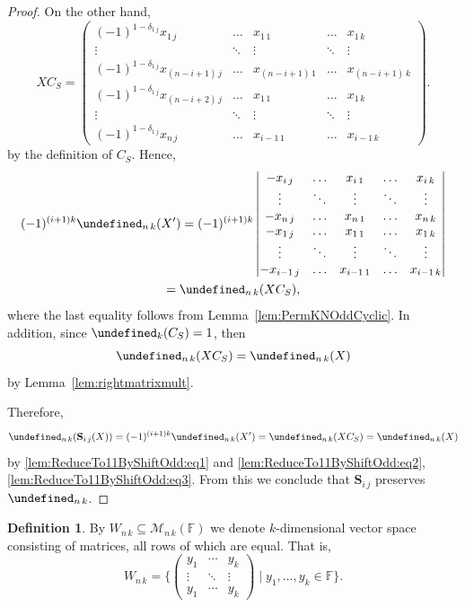 \documentclass{elsarticle}
\def\F{{\mathbb F}}
\def\M{{\mathcal M}}
\def\SCS{{\mathbf S}}
\let\det\undefined
\DeclareMathOperator{\det}{det}
\theoremstyle{plain}
\theoremstyle{definition}
\newtheorem{definition}[theorem]{Definition}
\numberwithin{equation}{section}
\begin{document}
\begin{proof}
On the other hand,  
\[
XC_S =  \begin{pmatrix}
(-1)^{1 - \delta_{1\,j}}x_{1\, j} & \ldots & x_{1\,1} & \ldots & x_{1\, k}\\
\vdots & \ddots & \vdots & \ddots  & \vdots\\
(-1)^{1 - \delta_{1\,j}}x_{(n-i+1)\, j} & \ldots & x_{(n-i+1)\,1} & \ldots & x_{(n-i+1)\, k}\\
(-1)^{1 - \delta_{1\,j}}x_{(n-i+2)\, j} & \ldots &  x_{1\,1} & \ldots & x_{1\, k}\\
\vdots & \ddots & \vdots & \ddots & \vdots\\
(-1)^{1 - \delta_{1\,j}}x_{n\, j} & \ldots & x_{i-1\,1} & \ldots &  x_{i-1\, k}
\end{pmatrix}.
\]
by the definition of $C_S$. Hence, \begin{multline}\label{lem:ReduceTo11ByShiftOdd:eq2}
(-1)^{(i+1)k}\det_{n\,k}(X') = (-1)^{(i+1)k}\begin{vmatrix}
-x_{i\, j} & \ldots & x_{i\,1} & \ldots & x_{i\, k}\\
\vdots & \ddots & \vdots & \ddots  & \vdots\\
-x_{n\, j} & \ldots & x_{n\,1} & \ldots & x_{n\, k}\\
-x_{1\, j} & \ldots &  x_{1\,1} & \ldots & x_{1\, k}\\
\vdots & \ddots & \vdots & \ddots & \vdots\\
-x_{i-1\, j} & \ldots & x_{i-1\,1} & \ldots &  x_{i-1\, k}
\end{vmatrix}\\
 = \det_{n\,k}(XC_S),
\end{multline}
where the last equality follows from Lemma~\ref{lem:PermKNOddCyclic}. In addition, since $\det_k(C_S) = 1$, then
\begin{equation}\label{lem:ReduceTo11ByShiftOdd:eq3}
\det_{n\,k}(XC_S) = \det_{n\,k}(X)
\end{equation}
by Lemma~\ref{lem:rightmatrixmult}.

Therefore, \[
\det_{n\,k}(\SCS_{i\,j}(X)) = (-1)^{(i+1)k}\det_{n\,k}(X') = \det_{n\,k}(XC_S) = \det_{n\,k}(X)
\]
by \eqref{lem:ReduceTo11ByShiftOdd:eq1} and \eqref{lem:ReduceTo11ByShiftOdd:eq2}, \eqref{lem:ReduceTo11ByShiftOdd:eq3}. From this we conclude that $\SCS_{i\,j}$ preserves $\det_{n\,k}$.
\end{proof}

\begin{definition}\label{def:WNK}By $W_{n\,k}\subseteq \M_{n\,k}(\F)$ we denote $k$-dimensional vector space consisting of matrices, all rows of which are equal. That is,
\[
W_{n\,k} = \{\begin{pmatrix}y_1 & \cdots & y_k\\ \vdots & \ddots & \vdots\\ y_1 & \cdots & y_k\end{pmatrix} \mid y_1, \ldots, y_k \in \F\}.
 \]
\end{definition}
\end{document}
